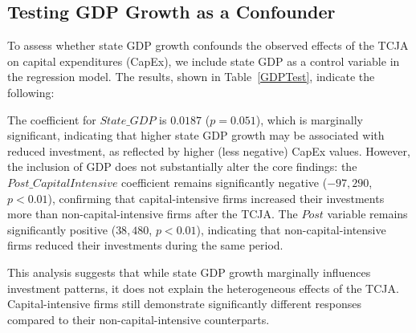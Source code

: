 \documentclass[11pt]{article}
\begin{document}
\subsection{Testing GDP Growth as a Confounder}
To assess whether state GDP growth confounds the observed effects of the TCJA on capital expenditures (CapEx), we include state GDP as a control variable in the regression model. The results, shown in Table~\ref{GDPTest}, indicate the following:

The coefficient for \(State\_GDP\) is \(0.0187\) (\(p=0.051\)), which is marginally significant, indicating that higher state GDP growth may be associated with reduced investment, as reflected by higher (less negative) CapEx values. However, the inclusion of GDP does not substantially alter the core findings: the \(Post\_CapitalIntensive\) coefficient remains significantly negative (\(-97,290\), \(p<0.01\)), confirming that capital-intensive firms increased their investments more than non-capital-intensive firms after the TCJA. The \(Post\) variable remains significantly positive (\(38,480\), \(p<0.01\)), indicating that non-capital-intensive firms reduced their investments during the same period.

This analysis suggests that while state GDP growth marginally influences investment patterns, it does not explain the heterogeneous effects of the TCJA. Capital-intensive firms still demonstrate significantly different responses compared to their non-capital-intensive counterparts.
\end{document}
